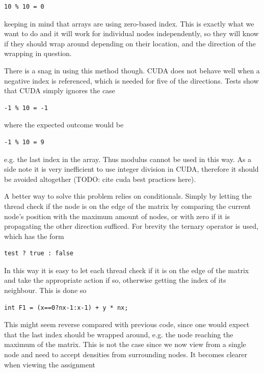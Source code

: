 \begin{verbatim}
10 % 10 = 0
\end{verbatim}

keeping in mind that arrays are using zero-based index. This is exactly what we want to do and it will work for individual nodes independently, so they will know if they should wrap around depending on their location, and the direction of the wrapping in question. 

There is a snag in using this method though. CUDA does not behave well when a negative index is referenced, which is needed for five of the directions. Tests show that CUDA simply ignores the case

\begin{verbatim}
-1 % 10 = -1
\end{verbatim}

where the expected outcome would be

\begin{verbatim}
-1 % 10 = 9
\end{verbatim}

e.g. the last index in the array. Thus modulus cannot be used in this way. As a side note it is very inefficient to use integer division in CUDA, therefore it should be avoided altogether (TODO: cite cuda best practices here).

A better way to solve this problem relies on conditionals. Simply by letting the thread check if the node is on the edge of the matrix by comparing the current node's position with the maximum amount of nodes, or with zero if it is propagating the other direction sufficed. For brevity the ternary operator is used, which has the form

\begin{verbatim}
test ? true : false
\end{verbatim}

In this way it is easy to let each thread check if it is on the edge of the matrix and take the appropriate action if so, otherwise getting the index of its neighbour. This is done so

\begin{verbatim}
int F1 = (x==0?nx-1:x-1) + y * nx;
\end{verbatim}

This might seem reverse compared with previous code, since one would expect that the last index should be wrapped around, e.g. the node reaching the maximum of the matrix. This is not the case since we now view from a single node and need to accept densities from surrounding nodes. It becomes clearer when viewing the assignment

